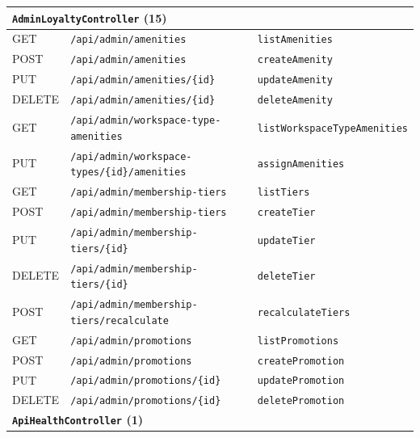 {\begin{longtable}{|p{1.5cm}|p{7.3cm}|p{5.0cm}|}
\hline
\multicolumn{3}{|l|}{\textbf{\texttt{AdminLoyaltyController} (15)}} \\
\hline
GET & \texttt{/\allowbreak api/\allowbreak admin/\allowbreak amenities} & \texttt{listAmenities} \\
\hline
POST & \texttt{/\allowbreak api/\allowbreak admin/\allowbreak amenities} & \texttt{createAmenity} \\
\hline
PUT & \texttt{/\allowbreak api/\allowbreak admin/\allowbreak amenities/\allowbreak \{id\}} & \texttt{updateAmenity} \\
\hline
DELETE & \texttt{/\allowbreak api/\allowbreak admin/\allowbreak amenities/\allowbreak \{id\}} & \texttt{deleteAmenity} \\
\hline
GET & \texttt{/\allowbreak api/\allowbreak admin/\allowbreak workspace-type-amenities} & \texttt{listWorkspaceTypeAmenities} \\
\hline
PUT & \texttt{/\allowbreak api/\allowbreak admin/\allowbreak workspace-types/\allowbreak \{id\}/\allowbreak amenities} & \texttt{assignAmenities} \\
\hline
GET & \texttt{/\allowbreak api/\allowbreak admin/\allowbreak membership-tiers} & \texttt{listTiers} \\
\hline
POST & \texttt{/\allowbreak api/\allowbreak admin/\allowbreak membership-tiers} & \texttt{createTier} \\
\hline
PUT & \texttt{/\allowbreak api/\allowbreak admin/\allowbreak membership-tiers/\allowbreak \{id\}} & \texttt{updateTier} \\
\hline
DELETE & \texttt{/\allowbreak api/\allowbreak admin/\allowbreak membership-tiers/\allowbreak \{id\}} & \texttt{deleteTier} \\
\hline
POST & \texttt{/\allowbreak api/\allowbreak admin/\allowbreak membership-tiers/\allowbreak recalculate} & \texttt{recalculateTiers} \\
\hline
GET & \texttt{/\allowbreak api/\allowbreak admin/\allowbreak promotions} & \texttt{listPromotions} \\
\hline
POST & \texttt{/\allowbreak api/\allowbreak admin/\allowbreak promotions} & \texttt{createPromotion} \\
\hline
PUT & \texttt{/\allowbreak api/\allowbreak admin/\allowbreak promotions/\allowbreak \{id\}} & \texttt{updatePromotion} \\
\hline
DELETE & \texttt{/\allowbreak api/\allowbreak admin/\allowbreak promotions/\allowbreak \{id\}} & \texttt{deletePromotion} \\
\hline
\multicolumn{3}{|l|}{\textbf{\texttt{ApiHealthController} (1)}} \\

\end{longtable}}
